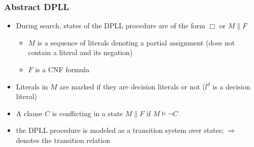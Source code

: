 \documentclass[smaller]{beamer}
\newcommand{\state}[2]{{#1\parallel #2}}
\begin{document}
\begin{frame}
\frametitle{Abstract DPLL}
\begin{itemize}
\setlength\itemsep{4mm}
\item During search, states of the DPLL procedure are of the form $\Box$ or $\state{M}{F}$
\begin{itemize}
	\item $M$ is a sequence of literals denoting a partial assignment (does not contain a literal and its negation)
	\item $F$ is a CNF formula
\end{itemize}
\item Literals in $M$ are marked if they are decision literals or not ($l^d$ is a decision literal)
\item A clause $C$ is conflicting in a state $\state{M}{F}$ if $M\models \neg C$ 
\item the DPLL procedure is modeled as a transition system over states; $\Longrightarrow$ denotes the transition relation
\end{itemize}
\end{frame}
\end{document}
